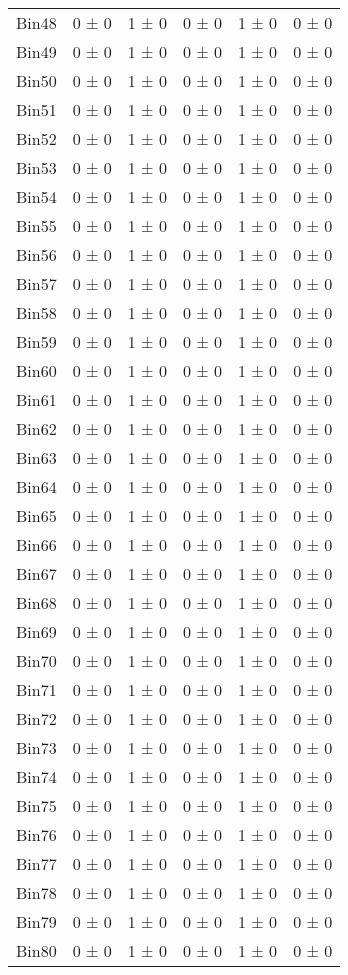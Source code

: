 \begin{tabular}{@{\extracolsep{4pt}}lccccc@{}}
     Bin48 & 0 ± 0 & 1 ± 0 & 0 ± 0 & 1 ± 0 & 0 ± 0 \\ 
     Bin49 & 0 ± 0 & 1 ± 0 & 0 ± 0 & 1 ± 0 & 0 ± 0 \\ 
     Bin50 & 0 ± 0 & 1 ± 0 & 0 ± 0 & 1 ± 0 & 0 ± 0 \\ 
     Bin51 & 0 ± 0 & 1 ± 0 & 0 ± 0 & 1 ± 0 & 0 ± 0 \\ 
     Bin52 & 0 ± 0 & 1 ± 0 & 0 ± 0 & 1 ± 0 & 0 ± 0 \\ 
     Bin53 & 0 ± 0 & 1 ± 0 & 0 ± 0 & 1 ± 0 & 0 ± 0 \\ 
     Bin54 & 0 ± 0 & 1 ± 0 & 0 ± 0 & 1 ± 0 & 0 ± 0 \\ 
     Bin55 & 0 ± 0 & 1 ± 0 & 0 ± 0 & 1 ± 0 & 0 ± 0 \\ 
     Bin56 & 0 ± 0 & 1 ± 0 & 0 ± 0 & 1 ± 0 & 0 ± 0 \\ 
     Bin57 & 0 ± 0 & 1 ± 0 & 0 ± 0 & 1 ± 0 & 0 ± 0 \\ 
     Bin58 & 0 ± 0 & 1 ± 0 & 0 ± 0 & 1 ± 0 & 0 ± 0 \\ 
     Bin59 & 0 ± 0 & 1 ± 0 & 0 ± 0 & 1 ± 0 & 0 ± 0 \\ 
     Bin60 & 0 ± 0 & 1 ± 0 & 0 ± 0 & 1 ± 0 & 0 ± 0 \\ 
     Bin61 & 0 ± 0 & 1 ± 0 & 0 ± 0 & 1 ± 0 & 0 ± 0 \\ 
     Bin62 & 0 ± 0 & 1 ± 0 & 0 ± 0 & 1 ± 0 & 0 ± 0 \\ 
     Bin63 & 0 ± 0 & 1 ± 0 & 0 ± 0 & 1 ± 0 & 0 ± 0 \\ 
     Bin64 & 0 ± 0 & 1 ± 0 & 0 ± 0 & 1 ± 0 & 0 ± 0 \\ 
     Bin65 & 0 ± 0 & 1 ± 0 & 0 ± 0 & 1 ± 0 & 0 ± 0 \\ 
     Bin66 & 0 ± 0 & 1 ± 0 & 0 ± 0 & 1 ± 0 & 0 ± 0 \\ 
     Bin67 & 0 ± 0 & 1 ± 0 & 0 ± 0 & 1 ± 0 & 0 ± 0 \\ 
     Bin68 & 0 ± 0 & 1 ± 0 & 0 ± 0 & 1 ± 0 & 0 ± 0 \\ 
     Bin69 & 0 ± 0 & 1 ± 0 & 0 ± 0 & 1 ± 0 & 0 ± 0 \\ 
     Bin70 & 0 ± 0 & 1 ± 0 & 0 ± 0 & 1 ± 0 & 0 ± 0 \\ 
     Bin71 & 0 ± 0 & 1 ± 0 & 0 ± 0 & 1 ± 0 & 0 ± 0 \\ 
     Bin72 & 0 ± 0 & 1 ± 0 & 0 ± 0 & 1 ± 0 & 0 ± 0 \\ 
     Bin73 & 0 ± 0 & 1 ± 0 & 0 ± 0 & 1 ± 0 & 0 ± 0 \\ 
     Bin74 & 0 ± 0 & 1 ± 0 & 0 ± 0 & 1 ± 0 & 0 ± 0 \\ 
     Bin75 & 0 ± 0 & 1 ± 0 & 0 ± 0 & 1 ± 0 & 0 ± 0 \\ 
     Bin76 & 0 ± 0 & 1 ± 0 & 0 ± 0 & 1 ± 0 & 0 ± 0 \\ 
     Bin77 & 0 ± 0 & 1 ± 0 & 0 ± 0 & 1 ± 0 & 0 ± 0 \\ 
     Bin78 & 0 ± 0 & 1 ± 0 & 0 ± 0 & 1 ± 0 & 0 ± 0 \\ 
     Bin79 & 0 ± 0 & 1 ± 0 & 0 ± 0 & 1 ± 0 & 0 ± 0 \\ 
     Bin80 & 0 ± 0 & 1 ± 0 & 0 ± 0 & 1 ± 0 & 0 ± 0 \\ 
\hline\hline
  \end{tabular}
